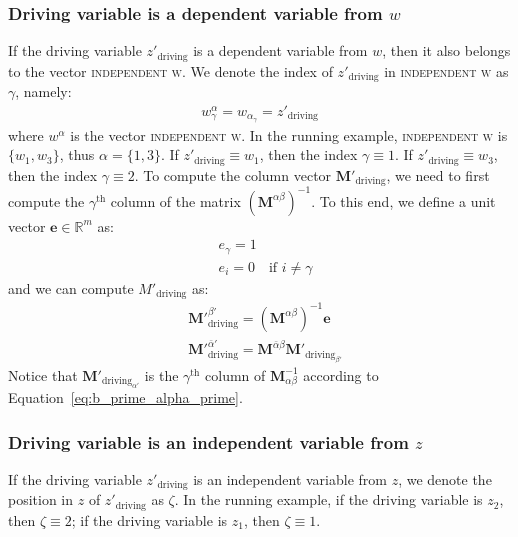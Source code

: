 \documentclass{article}
\providecommand{\vect}[1]{\bm#1}
\providecommand{\mat}[1]{\mathbf#1}
\newcommand{\1}{(\textos{1})\!}
\newcommand{\2}{(\textos{2})\!}
\newcommand{\3}{(\textos{3})\!}
\newcommand{\4}{(\textos{4})\!}
\newcommand{\5}{(\textos{5})\!}
\newcommand{\6}{(\textos{6})\!}
\newcommand{\7}{(\textos{7})\!}
\newcommand{\8}{(\textos{8})\!}
\begin{document}
\subsubsection{Driving variable is a dependent variable from $w$}
If the driving variable $z'_{\textrm{driving}}$ is a dependent variable from $w$, then it also belongs to the vector \textsc{independent w}. We denote the index of $z'_{\textrm{driving}}$ in \textsc{independent w} as $\gamma$, namely: 
\begin{align}
	w^{\alpha}_\gamma = w_{\alpha_\gamma} = z'_{\textrm{driving}} \tag{4}
\end{align}
where $w^{\alpha}$ is the vector \textsc{independent w}. In the running example,
\textsc{independent w} is $\{ w_1, w_3 \}$, thus $\alpha = \{ 1, 3 \}$. If
$z'_{\textrm{driving}} \equiv w_1$, then the index $\gamma \equiv 1$. If
$z'_{\textrm{driving}} \equiv w_3$, then the index $\gamma \equiv 2$. To compute
the column vector $\mat{M}'_{\textrm{driving}}$, we need to first compute the
$\gamma^{\textrm{th}}$ column of the matrix $(\mat{M}^{\alpha\beta})^{-1}$. To
this end, we define a unit vector $\vect{e} \in\mathbb{R}^m$ as:
\begin{align*}
	&e_{\gamma} = 1\\
	&e_i = 0 \quad \text{if } i \neq \gamma
\end{align*}
and we can compute $M'_{\textrm{driving}}$ as:
\begin{align}
	&\mat{M}'^{\beta'}_{\textrm{driving}} =
    (\mat{M}^{\alpha\beta})^{-1}\vect{e}\label{eq:b_prime_alpha_prime} 
    \tag{5}\\
	&\mat{M}'^{\bar{\alpha}'}_{\textrm{driving}} =
    \mat{M}^{\bar{\alpha}\beta}\mat{M}'_{\textrm{driving}_{\beta'}} \tag{6}
\end{align}
Notice that $\mat{M}'_{\textrm{driving}_{\alpha'}}$ is the
$\gamma^{\textrm{th}}$ column of $\mat{M}_{\alpha\beta}^{-1}$ according to Equation~\eqref{eq:b_prime_alpha_prime}.

\subsubsection{Driving variable is an independent variable from $z$}
If the driving variable $z'_{\textrm{driving}}$ is an independent variable from $z$, we denote the position in $z$ of $z'_{\textrm{driving}}$ as $\zeta$. In the running example, if the driving variable is $z_2$, then $\zeta \equiv 2$; if the driving variable is $z_1$, then $\zeta \equiv 1$.
\end{document}
